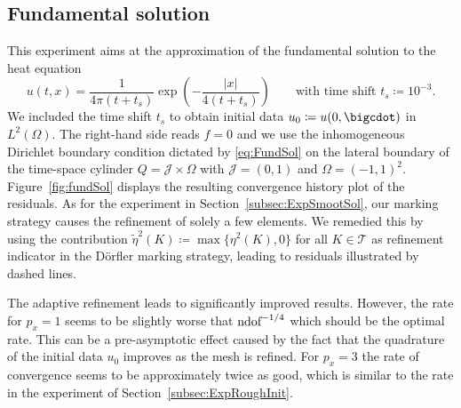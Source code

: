 \documentclass{amsart}
\providecommand{\tria}{\mathcal{T}}
\newcommand{\cJ}{\mathcal J}
\begin{document}
\subsection{Fundamental solution}\label{subsec:expFundSol}
This experiment aims at the approximation of the fundamental solution to the heat equation 
\begin{equation}\label{eq:FundSol}
u(t,x) = \frac{1}{4\pi (t+t_s)} \exp\left(-\frac{|x|}{4(t+t_s)}\right)   \qquad\text{with time shift }t_s \coloneqq 10^{-3}.
\end{equation}
We included the time shift $t_s$ to obtain initial data $u_0 \coloneqq u(0,\bigcdot)$ in $L^2(\Omega)$. 
The right-hand side reads $f =0$ and we use the inhomogeneous Dirichlet boundary condition dictated by \eqref{eq:FundSol} on the lateral boundary of the time-space cylinder $Q = \cJ \times \Omega$ with $\cJ = (0,1)$ and $\Omega = (-1,1)^2$. Figure~\ref{fig:fundSol} displays the resulting convergence history plot of the residuals. As for the experiment in Section~\ref{subsec:ExpSmootSol}, our marking strategy causes the refinement of solely a few elements. We remedied this by using the contribution $\tilde{\eta}^2(K) \coloneqq \max\lbrace \eta^2(K),0\rbrace$ for all $K\in \tria$ as refinement indicator in the D\"orfler marking strategy, leading to residuals illustrated by dashed lines.

The adaptive refinement leads to significantly improved results. However, the rate for $p_x=1$ seems to be slightly worse that $\textup{ndof}^{-1/4}$ which should be the optimal rate. This can be a pre-asymptotic effect caused by the fact that the quadrature of the initial data $u_0$ improves as the mesh is refined. For $p_x =3$ the rate of convergence seems to be approximately twice as good, which is similar to the rate in the experiment of Section~\ref{subsec:ExpRoughInit}.
 
\end{document}
